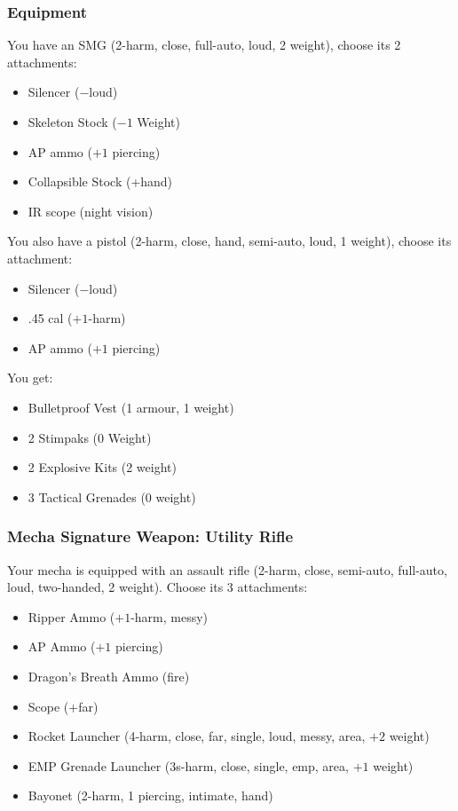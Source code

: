 \subsubsection{Equipment}
You have an SMG (2-harm, close, full-auto, loud, 2 weight), choose its 2 attachments:
\begin{itemize}
\item Silencer ($-$loud)
\item Skeleton Stock ($-1$ Weight)
\item AP ammo ($+1$ piercing)
\item Collapsible Stock (+hand)
\item IR scope (night vision)
\end{itemize}

You also have a pistol (2-harm, close, hand, semi-auto, loud, 1 weight), choose its attachment:
\begin{itemize}
\item Silencer ($-$loud)
\item .45 cal ($+1$-harm)
\item AP ammo ($+1$ piercing)
\end{itemize}

You get:
\begin{itemize}
\item Bulletproof Vest (1 armour, 1 weight)
\item 2 Stimpaks (0 Weight)
\item 2 Explosive Kits (2 weight)
\item 3 Tactical Grenades (0 weight)
\end{itemize}

\subsubsection{Mecha Signature Weapon: Utility Rifle}
Your mecha is equipped with an assault rifle (2-harm, close, semi-auto, full-auto, loud, two-handed, 2 weight). Choose its 3 attachments:
\begin{itemize}
\item Ripper Ammo ($+1$-harm, messy)
\item AP Ammo ($+1$ piercing)
\item Dragon's Breath Ammo (fire)
\item Scope (+far)
\item Rocket Launcher (4-harm, close, far, single, loud, messy, area, $+2$ weight)
\item EMP Grenade Launcher (3s-harm, close, single, emp, area, $+1$ weight)
\item Bayonet (2-harm, 1 piercing, intimate, hand)
\end{itemize}

